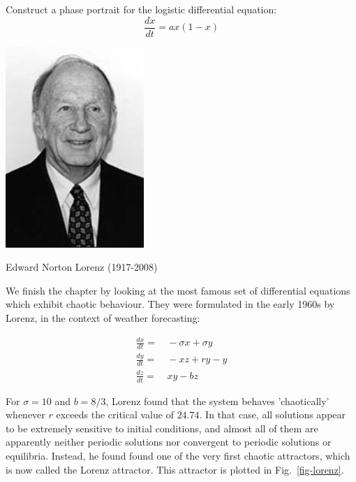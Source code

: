 \begin{exer}
Construct a phase portrait for the logistic differential equation:
$$\frac{dx}{dt} = a x (1-x)$$
\end{exer}

\pagebreak


\begin{marginfigure}[0.0cm]
  \includegraphics{dynamic/figures/e_lorenz}
  \caption{Edward Norton Lorenz (1917-2008)}
\end{marginfigure}

We finish the chapter by looking at the most famous set of differential equations which exhibit chaotic behaviour. They were formulated in the early 1960s by Lorenz, in the context of weather forecasting:

\begin{align}
\frac{dx}{dt} =& \, -\sigma x + \sigma y \\
\frac{dy}{dt} =& \, -xz + r y - y \\
\frac{dz}{dt} =& \, xy - bz
\end{align} 

For $\sigma=10$ and $b=8/3$, Lorenz found that the system behaves 'chaotically' whenever $r$ exceeds the critical value of $24.74$. In that case, all solutions appear to be extremely sensitive to initial conditions, and almost all of them are apparently neither periodic solutions nor convergent to periodic solutions or equilibria. Instead, he found found one of the very first chaotic attractors, which is now called the Lorenz attractor. This attractor is plotted in Fig.~\ref{fig-lorenz}.

